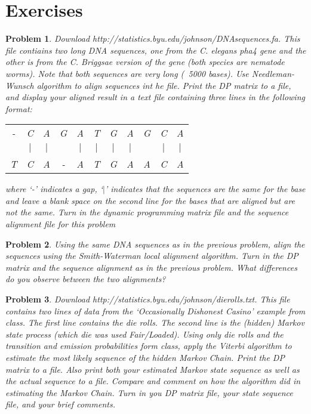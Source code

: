 \documentclass{article}
\numberwithin{equation}{section}
\newtheorem{problem}{Problem}
\begin{document}
\section{Exercises}

\begin{problem}
Download http://statistics.byu.edu/johnson/DNAsequences.fa.  This
file contiains two long DNA sequences, one from the \textit{C.
elegans pha4} gene and the other is from the \textit{C. Briggsae}
version of the gene (both species are nematode worms).  Note that
both sequences are very long (~5000 bases).  Use Needleman-Wunsch
algorithm to align sequences int he file.  Print the DP matrix to a
file, and display your aligned result in a text file containing
three lines in the following format:

\begin{tabular}{ccccccccccc}
- & C & A & G & A & T & G & A & G & C & A \\
  & $\mid$ & $\mid$ & & $\mid$ & $\mid$ & $\mid$ & $\mid$ & & $\mid$ & $\mid$ \\
T & C & A & - & A & T & G & A & A & C & A
\end{tabular}

where `-' indicates a gap, `$\mid$' indicates that the sequences are
the same for the base and leave a blank space on the second line for
the bases that are aligned but are not the same.  Turn in the
dynamic programming matrix file and the sequence alignment file for
this problem
\end{problem}

\begin{problem}
Using the same DNA sequences as in the previous problem, align the
sequences using the Smith-Waterman local alignment algorithm.  Turn
in the DP matrix and the sequence alignment as in the previous
problem.  What differences do you observe between the two
alignments?
\end{problem}

\begin{problem}
Download http://statistics.byu.edu/johnson/dierolls.txt.  This file
contains two lines of data from the `Occasionally Dishonest Casino'
example from class.  The first line contains the die rolls.  The
second line is the (hidden) Markov state process (which die was used
Fair/Loaded).  Using only die rolls and the transition and emission
probabilities form class, apply the Viterbi algorithm to estimate
the most likely sequence of the hidden Markov Chain.  Print the DP
matrix to a file.  Also print both your estimated Markov state
sequence as well as the actual sequence to a file.  Compare and
comment on how the algorithm did in estimating the Markov Chain.
Turn in you DP matrix file, your state sequence file, and your brief
comments.
\end{problem}
\end{document}
